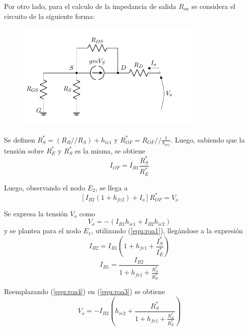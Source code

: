 Por otro lado, para el calculo de la impedancia de salida $R_{oa}$ se considera el circuito de la siguiente forma:
\begin{figure}[H]
\centering
	\includegraphics[width=0.8\textwidth, page=7]{Imagenes/ModeloIncremental.pdf}
\end{figure}
Se definen $R_{S}^* = \left( R_B // R_S \right) + h_{ie1}$ y $R_{OF}^* = R_{OF} // \frac{1}{h_{oe1}}$. Luego, sabiendo que la tensión sobre $R_{E}^*$ y $R_{S}^*$ es la misma, se obtiene
\begin{equation}
	I_{OF} = I_{B1} \frac{R_{S}^*}{R_{E}^*}
	\label{equ:roa1}
\end{equation}

Luego, observando el nodo $E_2$, se llega a
\begin{equation}
	\left[ I_{B2} \left( 1 + h_{fe2} \right) + I_o \right] R_{OF}^* = V_o
	\label{equ:roa2}
\end{equation}

Se expresa la tensión $V_o$ como
\begin{equation}
	V_o = - \left( I_{B1} h_{ie1} + I_{B2} h_{ie2} \right)
	\label{equ:roa3}
\end{equation}
y se plantea para el nodo $E_1$, utilizando (\ref{equ:roa1}), llegándose a la expresión
\begin{equation*}
	I_{B2} = I_{B1} \left( 1 +h_{fe1} + \frac{I_{S}^{*}}{I_{E}^{*}} \right)
\end{equation*}
\begin{equation}
	I_{B1} = \frac{I_{B2}}{1 +h_{fe1} + \frac{R_{S}^{*}}{R_{E}^{*}}}
	\label{equ:roa4}
\end{equation}

Reemplazando (\ref{equ:roa4}) en (\ref{equ:roa3}) se obtiene
\begin{equation}
	V_o = - I_{B2} \left( h_{ie2} + \frac{R_{S}^{*}}{ 1 +h_{fe1} + \frac{R_{S}^{*}}{R_{E}^{*}}} \right)
	\label{equ:roa5}
\end{equation}

